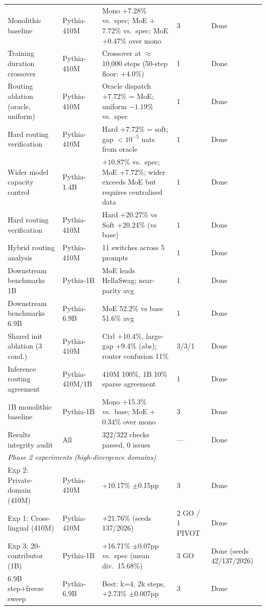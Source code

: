 \documentclass{article}
\begin{document}
\begin{table}[h]
{\begin{tabular}{p{5.0cm}p{2.8cm}p{5.5cm}p{1.8cm}p{3.5cm}}
Monolithic baseline & Pythia-410M & Mono $+$7.28\% vs.\ spec; MoE $+$7.72\% vs.\ spec; MoE $+$0.47\% over mono & 3 & Done \\
Training duration crossover & Pythia-410M & Crossover at $\approx$10,000 steps (50-step floor: +4.0\%) & 1 & Done \\
Routing ablation (oracle, uniform) & Pythia-410M & Oracle dispatch $+7.72\%$ = MoE; uniform $-1.19\%$ vs.\ spec & 1 & Done \\
Hard routing verification & Pythia-410M & Hard $+7.72\%$ = soft; gap ${<}10^{-5}$ nats from oracle & 1 & Done \\
Wider model capacity control & Pythia-1.4B & $+10.87\%$ vs.\ spec; MoE $+7.72\%$; wider exceeds MoE but requires centralised data & 1 & Done \\
Hard routing verification & Pythia-410M & Hard +20.27\% vs Soft +20.24\% (vs base) & 1 & Done \\
Hybrid routing analysis & Pythia-410M & 11 switches across 5 prompts & 1 & Done \\
Downstream benchmarks 1B & Pythia-1B & MoE leads HellaSwag; near-parity avg & 1 & Done \\
Downstream benchmarks 6.9B & Pythia-6.9B & MoE 52.2\% vs base 51.6\% avg & 1 & Done \\
Shared init ablation (3 cond.) & Pythia-410M & Ctrl +10.4\%, large-gap +9.4\% (abs); router confusion 11\% & 3/3/1 & Done \\
Inference routing agreement & Pythia-410M/1B & 410M 100\%, 1B 10\% sparse agreement & 1 & Done \\
1B monolithic baseline & Pythia-1B & Mono $+$15.3\% vs.\ base; MoE $+$0.34\% over mono & 3 & Done \\
Results integrity audit & All & 322/322 checks passed, 0 issues & --- & Done \\
\midrule
\multicolumn{5}{l}{\textit{Phase 2 experiments (high-divergence domains)}} \\
\midrule
Exp 2: Private-domain (410M) & Pythia-410M & +10.17\% $\pm$0.15pp & 3 & Done \\
Exp 1: Cross-lingual (410M) & Pythia-410M & +21.76\% (seeds 137/2026) & 2 GO / 1 PIVOT & Done \\
Exp 3: 20-contributor (1B) & Pythia-1B & +16.71\% $\pm$0.07pp vs.\ spec (mean div.\ 15.68\%) & 3 GO & Done (seeds 42/137/2026) \\
6.9B step+freeze sweep & Pythia-6.9B & Best: k=4, 2k steps, +2.73\% $\pm$0.007pp & 3 & Done \\
\bottomrule
\end{tabular}%
}
\end{table}
\end{document}
